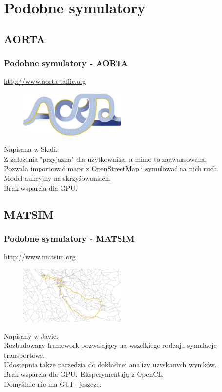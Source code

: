 \documentclass[slidestop, compress, 10pt]{beamer}
\begin{document}
\section{Podobne symulatory}
    \subsection{AORTA}
    \begin{frame}
        \frametitle{Podobne symulatory - AORTA}
        \url{http://www.aorta-taffic.org} \\
        \begin{figure}
            \includegraphics[width=200px]{aorta.png}
        \end{figure}
        Napisana w Skali. \\
        Z założenia "przyjazna" dla użytkownika, a mimo to zaawansowana. \\
        Pozwala importować mapy z OpenStreetMap i symulować na nich ruch. \\
        Model aukcyjny na skrzyżowaniach, \\
        Brak wsparcia dla GPU.
    \end{frame}

    \subsection{MATSIM}
    \begin{frame}
        \frametitle{Podobne symulatory - MATSIM}
        \url{http://www.matsim.org} \\
        \begin{figure}
            \includegraphics[width=200px]{matsim.png}
        \end{figure}
        Napisany w Javie. \\
        Rozbudowany framework pozwalający na wszelkiego rodzaju symulacje transportowe. \\
        Udostępnia także narzędzia do dokładnej analizy uzyskanych wyników. \\
        Brak wsparcia dla GPU.\ Eksperymentują z OpenCL. \\
        Domyślnie nie ma GUI - jeszcze.
    \end{frame}
\end{document}
